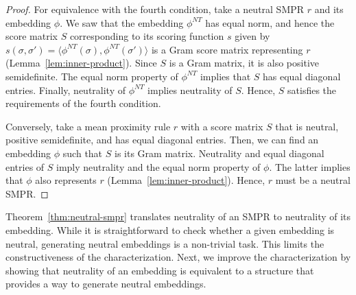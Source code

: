 \documentclass[prodmode,acmec]{ec-acmsmall}
\newcommand{\nt}{NT}
\begin{document}
\begin{proof}
For equivalence with the fourth condition, take a neutral SMPR $r$ and its embedding $\phi$. We saw that the embedding $\phi^{\nt}$ has equal norm, and hence the score matrix $S$ corresponding to its scoring function $s$ given by $s(\sigma,\sigma') = \langle \phi^{\nt}(\sigma),\phi^{\nt}(\sigma')\rangle$ is a Gram score matrix representing $r$ (Lemma~\ref{lem:inner-product}). Since $S$ is a Gram matrix, it is also positive semidefinite. The equal norm property of $\phi^{\nt}$ implies that $S$ has equal diagonal entries. Finally, neutrality of $\phi^{\nt}$ implies neutrality of $S$. Hence, $S$ satisfies the requirements of the fourth condition. 

Conversely, take a mean proximity rule $r$ with a score matrix $S$ that is neutral, positive semidefinite, and has equal diagonal entries. Then, we can find an embedding $\phi$ such that $S$ is its Gram matrix. Neutrality and equal diagonal entries of $S$ imply neutrality and the equal norm property of $\phi$. The latter implies that $\phi$ also represents $r$ (Lemma~\ref{lem:inner-product}). Hence, $r$ must be a neutral SMPR. 
\end{proof}


\noindent
Theorem~\ref{thm:neutral-smpr} translates neutrality of an SMPR to neutrality of its embedding. While it is straightforward to check whether a given embedding is neutral, generating neutral embeddings is a non-trivial task. This limits the constructiveness of the characterization. Next, we improve the characterization by showing that neutrality of an embedding is equivalent to a structure that provides a way to generate neutral embeddings. 
\end{document}
